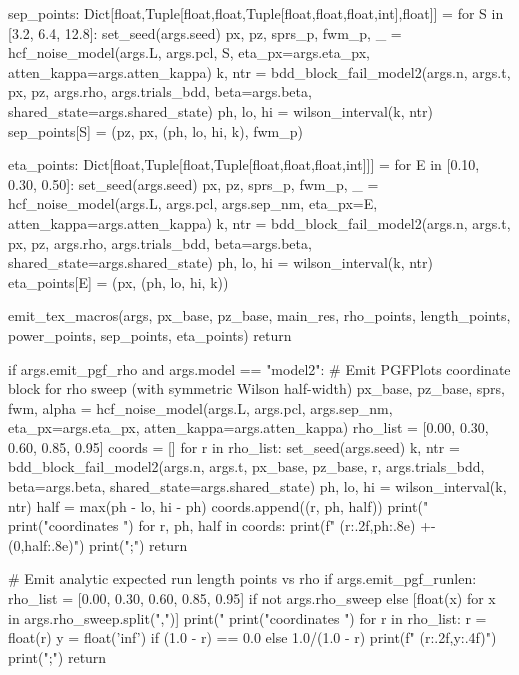 {{{{        sep_points: Dict[float,Tuple[float,float,Tuple[float,float,float,int],float]] = {}
        for S in [3.2, 6.4, 12.8]:
            set_seed(args.seed)
            px, pz, sprs_p, fwm_p, _ = hcf_noise_model(args.L, args.pcl, S,
                                                       eta_px=args.eta_px, atten_kappa=args.atten_kappa)
            k, ntr = bdd_block_fail_model2(args.n, args.t, px, pz, args.rho, args.trials_bdd,
                                           beta=args.beta, shared_state=args.shared_state)
            ph, lo, hi = wilson_interval(k, ntr)
            sep_points[S] = (pz, px, (ph, lo, hi, k), fwm_p)

        eta_points: Dict[float,Tuple[float,Tuple[float,float,float,int]]] = {}
        for E in [0.10, 0.30, 0.50]:
            set_seed(args.seed)
            px, pz, sprs_p, fwm_p, _ = hcf_noise_model(args.L, args.pcl, args.sep_nm,
                                                       eta_px=E, atten_kappa=args.atten_kappa)
            k, ntr = bdd_block_fail_model2(args.n, args.t, px, pz, args.rho, args.trials_bdd,
                                           beta=args.beta, shared_state=args.shared_state)
            ph, lo, hi = wilson_interval(k, ntr)
            eta_points[E] = (px, (ph, lo, hi, k))

        emit_tex_macros(args, px_base, pz_base, main_res, rho_points, length_points, power_points, sep_points, eta_points)
        return

    if args.emit_pgf_rho and args.model == "model2":
        # Emit PGFPlots coordinate block for rho sweep (with symmetric Wilson half-width)
        px_base, pz_base, sprs, fwm, alpha = hcf_noise_model(args.L, args.pcl, args.sep_nm,
                                                             eta_px=args.eta_px, atten_kappa=args.atten_kappa)
        rho_list = [0.00, 0.30, 0.60, 0.85, 0.95]
        coords = []
        for r in rho_list:
            set_seed(args.seed)
            k, ntr = bdd_block_fail_model2(args.n, args.t, px_base, pz_base, r, args.trials_bdd,
                                           beta=args.beta, shared_state=args.shared_state)
            ph, lo, hi = wilson_interval(k, ntr)
            half = max(ph - lo, hi - ph)
            coords.append((r, ph, half))
        print("%
        print("coordinates {")
        for r, ph, half in coords:
            print(f"  ({r:.2f},{ph:.8e}) +- (0,{half:.8e})")
        print("};")
        return

    # Emit analytic expected run length points vs rho
    if args.emit_pgf_runlen:
        rho_list = [0.00, 0.30, 0.60, 0.85, 0.95] if not args.rho_sweep else [float(x) for x in args.rho_sweep.split(",")]
        print("%
        print("coordinates {")
        for r in rho_list:
            r = float(r)
            y = float('inf') if (1.0 - r) == 0.0 else 1.0/(1.0 - r)
            print(f"  ({r:.2f},{y:.4f})")
        print("};")
        return

}}}}
